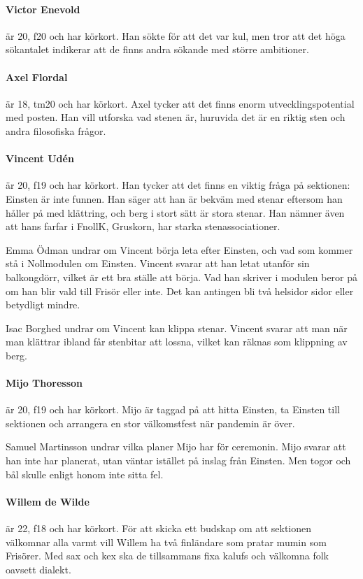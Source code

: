 \documentclass[hidelinks]{sektionsmote}
\begin{document}
\paragraph{Victor Enevold} är 20, f20 och har körkort.
Han sökte för att det var kul, men tror att det höga sökantalet indikerar att de finns andra sökande med större ambitioner.

\paragraph{Axel Flordal} är 18, tm20 och har körkort.
Axel tycker att det finns enorm utvecklingspotential med posten.
Han vill utforska vad stenen är, huruvida det är en riktig sten och andra filosofiska frågor.

\paragraph{Vincent Udén} är 20, f19 och har körkort.
Han tycker att det finns en viktig fråga på sektionen: Einsten är inte funnen.
Han säger att han är bekväm med stenar eftersom han håller på med klättring, och berg i stort sätt är stora stenar.
Han nämner även att hans farfar i FnollK, Gruskorn, har starka stenassociationer.

Emma Ödman undrar om Vincent börja leta efter Einsten, och vad som kommer stå i Nollmodulen om Einsten.
Vincent svarar att han letat utanför sin balkongdörr, vilket är ett bra ställe att börja.
Vad han skriver i modulen beror på om han blir vald till Frisör eller inte.
Det kan antingen bli två helsidor sidor eller betydligt mindre.

Isac Borghed undrar om Vincent kan klippa stenar.
Vincent svarar att man när man klättrar ibland får stenbitar att lossna, vilket kan räknas som klippning av berg.

\paragraph{Mijo Thoresson} är 20, f19 och har körkort.
Mijo är taggad på att hitta Einsten, ta Einsten till sektionen och arrangera en stor välkomstfest när pandemin är över.

Samuel Martinsson undrar vilka planer Mijo har för ceremonin.
Mijo svarar att han inte har planerat, utan väntar istället på inslag från Einsten.
Men togor och bål skulle enligt honom inte sitta fel.

\paragraph{Willem de Wilde} är 22, f18 och har körkort.
För att skicka ett budskap om att sektionen välkomnar alla varmt vill Willem ha två finländare som pratar mumin som Frisörer.
Med sax och kex ska de tillsammans fixa kalufs och välkomna folk oavsett dialekt.
\end{document}

